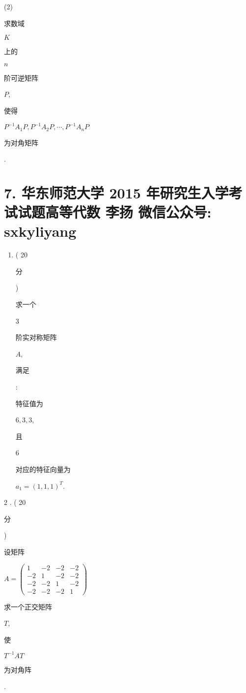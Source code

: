 \documentclass[10pt]{article}
\begin{document}
(2) \begin{CJK}{UTF8}{mj}求数域\end{CJK} $K$ \begin{CJK}{UTF8}{mj}上的\end{CJK} $n$ \begin{CJK}{UTF8}{mj}阶可逆矩阵\end{CJK} $P$, \begin{CJK}{UTF8}{mj}使得\end{CJK} $P^{-1} A_{1} P, P^{-1} A_{2} P, \cdots, P^{-1} A_{n} P$ \begin{CJK}{UTF8}{mj}为对角矩阵\end{CJK}.

\section{7. 华东师范大学 2015 年研究生入学考试试题高等代数 
 李扬 
 微信公众号: sxkyliyang}
\begin{enumerate}
  \item ( 20 \begin{CJK}{UTF8}{mj}分\end{CJK}) \begin{CJK}{UTF8}{mj}求一个\end{CJK} 3 \begin{CJK}{UTF8}{mj}阶实对称矩阵\end{CJK} $A$, \begin{CJK}{UTF8}{mj}满足\end{CJK}: \begin{CJK}{UTF8}{mj}特征值为\end{CJK} $6,3,3$, \begin{CJK}{UTF8}{mj}且\end{CJK} 6 \begin{CJK}{UTF8}{mj}对应的特征向量为\end{CJK} $a_{1}=(1,1,1)^{T}$.
\end{enumerate}
2 . ( 20 \begin{CJK}{UTF8}{mj}分\end{CJK}) \begin{CJK}{UTF8}{mj}设矩阵\end{CJK} $A=\left(\begin{array}{cccc}1 & -2 & -2 & -2 \\ -2 & 1 & -2 & -2 \\ -2 & -2 & 1 & -2 \\ -2 & -2 & -2 & 1\end{array}\right)$ \begin{CJK}{UTF8}{mj}求一个正交矩阵\end{CJK} $T$, \begin{CJK}{UTF8}{mj}使\end{CJK} $T^{-1} A T$ \begin{CJK}{UTF8}{mj}为对角阵\end{CJK}.
\end{document}
